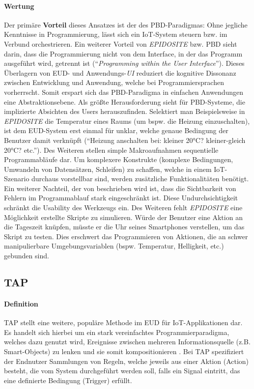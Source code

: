 \paragraph{Wertung} Der primäre \textbf{Vorteil} dieses Ansatzes ist der des \ac{PBD}-Paradigmas: Ohne jegliche Kenntnisse in Programmierung, lässt sich ein \ac{IoT}-System steuern bzw. im Verbund orchestrieren. Ein weiterer Vorteil von \textit{EPIDOSITE} bzw. \ac{PBD} sieht \cite{cypher1993pbd} darin, dass die Programmierung nicht von dem Interface, in der das Programm ausgeführt wird, getrennt ist ("`\textit{Programming within the User Interface}"'). Dieses Überlagern von \ac{EUD}- und Anwendungs-\textit{UI} reduziert die kognitive Dissonanz zwischen Entwicklung und Anwendung, welche bei Programmiersprachen vorherrscht. Somit erspart sich das \ac{PBD}-Paradigma in einfachen Anwendungen eine Abstraktionsebene. Als größte Herausforderung sieht \cite{cypher1993pbd} für \ac{PBD}-Systeme, die implizierte Absichten des Users herauszufinden. Selektiert man Beispielsweise in \textit{EPIDOSITE} die Temperatur eines Raums (um bspw. die Heizung einzuschalten), ist dem \ac{EUD}-System erst einmal für unklar, welche genaue Bedingung der Benutzer damit verknüpft ("`Heizung anschalten bei: kleiner 20°C? kleiner-gleich 20°C? etc."'). Des Weiteren stellen simple Makroaufnahmen sequentielle Programmabläufe dar. Um komplexere Konstrukte (komplexe Bedingungen, Umwandeln von Datensätzen, Schleifen) zu schaffen, welche in einem \ac{IoT}-Szenario durchaus vorstellbar sind, werden zusätzliche Funktionalitäten benötigt. Ein weiterer Nachteil, der von \cite{li2017programming} beschrieben wird ist, dass die Sichtbarkeit von Fehlern im Programmablauf stark eingeschränkt ist. Diese Undurchsichtigkeit schränkt die Usability des Werkzeugs ein. Des Weiteren fehlt \textit{EPIDOSITE} eine Möglichkeit erstellte Skripte zu simulieren. Würde der Benutzer eine Aktion an die Tageszeit knüpfen, müsste er die Uhr seines Smartphones verstellen, um das Skript zu testen. Dies erschwert das Programmieren von Aktionen, die an schwer manipulierbare Umgebungsvariablen (bspw. Temperatur, Helligkeit, etc.) gebunden sind.

\subsection{\acl{TAP}}
\paragraph{Definition} \ac{TAP} stellt eine weitere, populäre Methode im \ac{EUD} für \ac{IoT}-Applikationen dar. Es handelt sich hierbei um ein stark vereinfachtes Programmierparadigma, welches dazu genutzt wird, Ereignisse zwischen mehreren Informationsquelle (z.B. Smart-Objects) zu lenken und sie somit kompositionieren \cite{ur2014practical}. Bei \ac{TAP} spezifiziert der Endnutzer Sammlungen von Regeln, welche jeweils aus einer Aktion (Action) besteht, die vom System durchgeführt werden soll, falls ein Signal eintritt, das eine definierte Bedingung (Trigger) erfüllt. 


